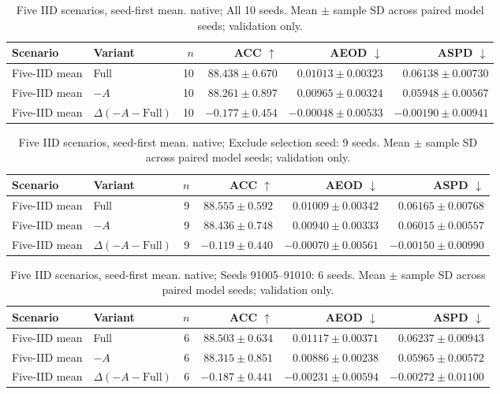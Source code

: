 \begin{table}[t]
\centering
\small
\caption{Five IID scenarios, seed-first mean. native; All 10 seeds. Mean $\pm$ sample SD across paired model seeds; validation only.}
\begin{tabular}{llrrrr}
\toprule
Scenario & Variant & $n$ & ACC $\uparrow$ & AEOD $\downarrow$ & ASPD $\downarrow$ \\
\midrule
Five-IID mean & Full & 10 & $88.438 \pm 0.670$ & $0.01013 \pm 0.00323$ & $0.06138 \pm 0.00730$ \\
Five-IID mean & $-A$ & 10 & $88.261 \pm 0.897$ & $0.00965 \pm 0.00324$ & $0.05948 \pm 0.00567$ \\
Five-IID mean & $\Delta(-A-\mathrm{Full})$ & 10 & $-0.177 \pm 0.454$ & $-0.00048 \pm 0.00533$ & $-0.00190 \pm 0.00941$ \\
\bottomrule
\end{tabular}
\end{table}

\begin{table}[t]
\centering
\small
\caption{Five IID scenarios, seed-first mean. native; Exclude selection seed: 9 seeds. Mean $\pm$ sample SD across paired model seeds; validation only.}
\begin{tabular}{llrrrr}
\toprule
Scenario & Variant & $n$ & ACC $\uparrow$ & AEOD $\downarrow$ & ASPD $\downarrow$ \\
\midrule
Five-IID mean & Full & 9 & $88.555 \pm 0.592$ & $0.01009 \pm 0.00342$ & $0.06165 \pm 0.00768$ \\
Five-IID mean & $-A$ & 9 & $88.436 \pm 0.748$ & $0.00940 \pm 0.00333$ & $0.06015 \pm 0.00557$ \\
Five-IID mean & $\Delta(-A-\mathrm{Full})$ & 9 & $-0.119 \pm 0.440$ & $-0.00070 \pm 0.00561$ & $-0.00150 \pm 0.00990$ \\
\bottomrule
\end{tabular}
\end{table}

\begin{table}[t]
\centering
\small
\caption{Five IID scenarios, seed-first mean. native; Seeds 91005–91010: 6 seeds. Mean $\pm$ sample SD across paired model seeds; validation only.}
\begin{tabular}{llrrrr}
\toprule
Scenario & Variant & $n$ & ACC $\uparrow$ & AEOD $\downarrow$ & ASPD $\downarrow$ \\
\midrule
Five-IID mean & Full & 6 & $88.503 \pm 0.634$ & $0.01117 \pm 0.00371$ & $0.06237 \pm 0.00943$ \\
Five-IID mean & $-A$ & 6 & $88.315 \pm 0.851$ & $0.00886 \pm 0.00238$ & $0.05965 \pm 0.00572$ \\
Five-IID mean & $\Delta(-A-\mathrm{Full})$ & 6 & $-0.187 \pm 0.441$ & $-0.00231 \pm 0.00594$ & $-0.00272 \pm 0.01100$ \\
\bottomrule
\end{tabular}
\end{table}


